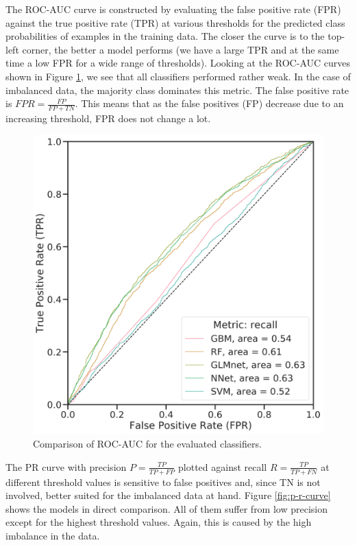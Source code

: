 \documentclass[
  11pt,
  a4paper,
  DIV=12,captions=tableheading,oneside,titlepage]{scrbook}
\begin{document}
The ROC-AUC curve is constructed by evaluating the false positive rate (FPR) against the true positive rate (TPR) at various thresholds for the predicted class probabilities of examples in the training data. The closer the curve is to the top-left corner, the better a model performs (we have a large TPR and at the same time a low FPR for a wide range of thresholds). Looking at the ROC-AUC curves shown in Figure \ref{fig:roc-auc-curve}, we see that all classifiers performed rather weak. In the case of imbalanced data, the majority class dominates this metric. The false positive rate is \(FPR = \frac{FP}{FP+TN}\). This means that as the false positives (FP) decrease due to an increasing threshold, FPR does not change a lot.



\begin{figure}

{\centering \includegraphics[width=0.7\linewidth]{figures/learning/roc_auc_compared_refit_recall} 

}

\caption{Comparison of ROC-AUC for the evaluated classifiers.}\label{fig:roc-auc-curve}
\end{figure}

The PR curve with precision \(P = \frac{TP}{TP+FP}\) plotted against recall \(R = \frac{TP}{{TP+FN}}\) at different threshold values is sensitive to false positives and, since TN is not involved, better suited for the imbalanced data at hand. Figure \ref{fig:p-r-curve} shows the models in direct comparison. All of them suffer from low precision except for the highest threshold values. Again, this is caused by the high imbalance in the data.
\end{document}
